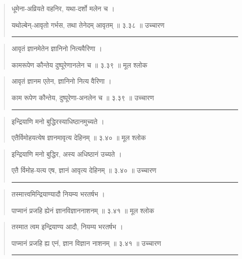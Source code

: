 \begin{quotation}

धूमेना-अव्रियते वहनिर, यथा-दर्शो मलेन च ।  

यथोल्बेन्-आवृतो गर्भस, तथा तेनेदम् आवृतम्‌  ॥ ३.३८ ॥  उच्चारण

\noindent\rule{16cm}{0.4pt} 
\end{quotation}


\begin{quotation}

आवृतं ज्ञानमेतेन ज्ञानिनो नित्यवैरिणा  ।  

कामरूपेण कौन्तेय दुष्पूरेणानलेन च  ॥ ३.३९ ॥  मूल श्लोक
\end{quotation}

\begin{quotation}

आवृतं ज्ञानम एतेन, ज्ञानिनो नित्य वैरिणा  ।  

काम रूपेण कौन्तेय, दुष्पूरेणा-अनलेन च  ॥ ३.३९ ॥  उच्चारण

\noindent\rule{16cm}{0.4pt} 
\end{quotation}


\begin{quotation}


इन्द्रियाणि मनो बुद्धिरस्याधिष्ठानमुच्यते  ।  

एतैर्विमोहयत्येष ज्ञानमावृत्य देहिनम्‌  ॥ ३.४० ॥  मूल श्लोक
\end{quotation}

\begin{quotation}

इन्द्रियाणि मनो बुद्धिर, अस्य अधिष्ठानं उच्यते  ।  

एतै र्विमोह-यत्य एष, ज्ञानं आवृत्य देहिनम्‌  ॥ ३.४० ॥  उच्चारण

\noindent\rule{16cm}{0.4pt} 
\end{quotation}


\begin{quotation}

तस्मात्त्वमिन्द्रियाण्यादौ नियम्य भरतर्षभ  ।  

पाप्मानं प्रजहि ह्येनं ज्ञानविज्ञाननाशनम्‌  ॥ ३.४१ ॥  मूल श्लोक
\end{quotation}

\begin{quotation}

तस्मात त्वम इन्द्रियाण्य आदौ, नियम्य भरतर्षभ  ।  

पाप्मानं प्रजहि ह्य एनं, ज्ञान विज्ञान नाशनम्‌  ॥ ३.४१ ॥  उच्चारण

\noindent\rule{16cm}{0.4pt} 
\end{quotation}


